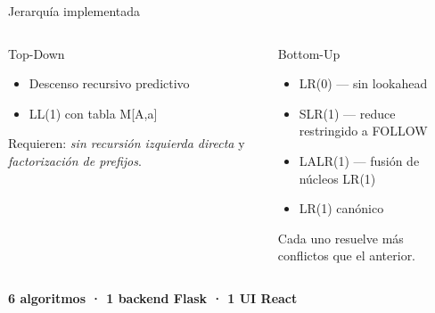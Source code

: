 \documentclass[aspectratio=169,10pt]{beamer}
\begin{document}
\begin{frame}{Jerarquía implementada}
  \begin{columns}[T,onlytextwidth]
    \begin{block}{\textcolor{plPrimary}{Top-Down}}
      \begin{itemize}
        \item Descenso recursivo predictivo
        \item LL(1) con tabla M[A,a]
      \end{itemize}
      \vspace{6pt}
      Requieren: \emph{sin recursión izquierda directa} y
      \emph{factorización de prefijos}.
    \end{block}

    \begin{block}{\textcolor{plWarning}{Bottom-Up}}
      \begin{itemize}
        \item LR(0) — sin lookahead
        \item SLR(1) — reduce restringido a FOLLOW
        \item LALR(1) — fusión de núcleos LR(1)
        \item LR(1) canónico
      \end{itemize}
      Cada uno resuelve más conflictos que el anterior.
    \end{block}
  \end{columns}

  \vspace{8pt}
  \centering
  \footnotesize
  \textbf{6 algoritmos · 1 backend Flask · 1 UI React}
\end{frame}
\end{document}
